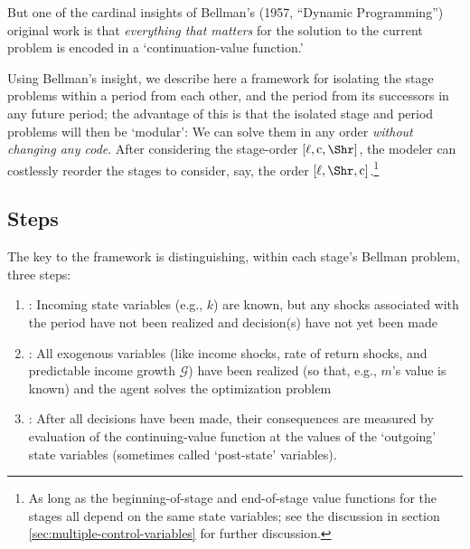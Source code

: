 \documentclass[titlepage, headings=optiontotocandhead]{Resources/texmf-local/tex/latex/econtex}
\begin{document}
But one of the cardinal insights of Bellman's (1957, ``Dynamic Programming'') original work is that \emph{everything that matters} for the solution to the current problem is encoded in a `continuation-value function.' %

Using Bellman's insight, we describe here a framework for isolating the {stage} problems within a {period} from each other, and the {period} from its successors in any future {period}; the advantage of this is that the isolated {stage} and {period} problems will then be `modular': We can solve them in any order \textit{without changing any code}. After considering the {stage}-order $[\ell,\mathrm{c},\Shr]$, the modeler can costlessly reorder the {stage}s to consider, say, the order $[\ell,\Shr,\mathrm{c}]$.\footnote{As long as the beginning-of-{stage} and end-of-{stage} value functions for the {stage}s all depend on the same state variables; see the discussion in section \ref{sec:multiple-control-variables} for further discussion.}

\subsection{Steps}

The key to the framework is distinguishing, within each {stage}'s Bellman problem, three {steps}:

\begin{enumerate}
\item \textbf{\Arrival}: Incoming state variables (e.g., $k$) are known, but any shocks associated with the period have not been realized and decision(s) have not yet been made
\item \textbf{\Decision}: All exogenous variables (like income shocks, rate of return shocks, and predictable income growth $\mathcal{G}$) have been realized (so that, e.g., $m$'s value is known) and the agent solves the optimization problem
\item \textbf{\Continuation}: After all decisions have been made, their consequences are measured by evaluation of the continuing-value function at the values of the `outgoing' state variables (sometimes called `post-state' variables).
\end{enumerate}
\end{document}
